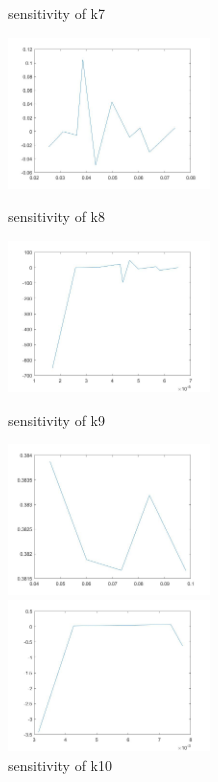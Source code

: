 \begin{figure}
\begin{varwidth}[t]{\textwidth}
	\end{varwidth}
	\caption{sensitivity of k7}
	\begin{varwidth}[t]{\textwidth}
		\vspace{0pt}
		\includegraphics[height=4cm]{s8.jpg}
	\end{varwidth}
	\caption{sensitivity of k8}
	\begin{varwidth}[t]{\textwidth}
		\vspace{0pt}
		\includegraphics[height=4cm]{s9.jpg}
	\end{varwidth}
	\caption{sensitivity of k9}
	\begin{varwidth}[t]{\textwidth}
		\vspace{0pt}
		\includegraphics[height=4cm]{s10.jpg}
	\end{varwidth}
	\caption{sensitivity of k10}
	\begin{varwidth}[t]{\textwidth}
		\vspace{0pt}
		\includegraphics[height=4cm]{sd1.jpg}

\end{varwidth}
\end{figure}
